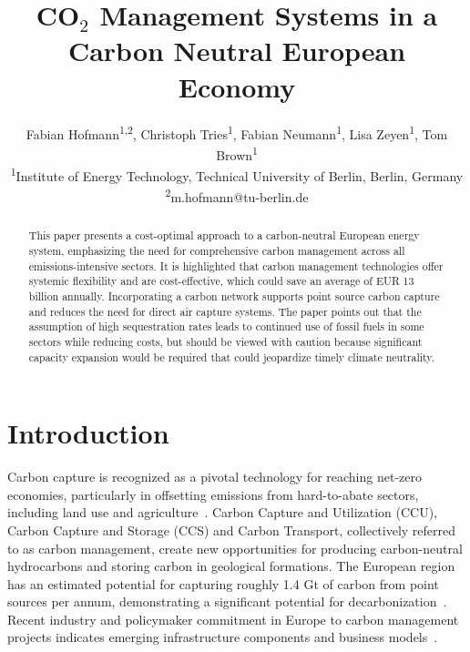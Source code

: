 \documentclass[twocolumn]{article}
\newcommand{\carbon}{CO$_2$}
\begin{document}
\title{\carbon{} Management Systems in a Carbon Neutral European Economy}

\author{
    Fabian Hofmann\textsuperscript{1,2},
    Christoph Tries\textsuperscript{1},
    Fabian Neumann\textsuperscript{1},
    Lisa Zeyen\textsuperscript{1},
    Tom Brown\textsuperscript{1}
    \vspace{.5em}
    \\
    \textsuperscript{1}Institute of Energy Technology, Technical University of Berlin, Berlin, Germany \\
    \textsuperscript{2}m.hofmann@tu-berlin.de
}

\maketitle

\begin{abstract}
    This paper presents a cost-optimal approach to a carbon-neutral European energy system, emphasizing the need for comprehensive carbon management across all emissions-intensive sectors. It is highlighted that carbon management technologies offer systemic flexibility and are cost-effective, which could save an average of EUR 13 billion annually. Incorporating a carbon network supports point source carbon capture and reduces the need for direct air capture systems. The paper points out that the assumption of high sequestration rates leads to continued use of fossil fuels in some sectors while reducing costs, but should be viewed with caution because significant capacity expansion would be required that could jeopardize timely climate neutrality.
\end{abstract}



\section{Introduction}
\label{sec:introduction}

Carbon capture is recognized as a pivotal technology for reaching net-zero economies, particularly in offsetting emissions from hard-to-abate sectors, including land use and agriculture~\cite{arniehellerNewCarbonEconomy2019}. Carbon Capture and Utilization (CCU), Carbon Capture and Storage (CCS) and Carbon Transport, collectively referred to as carbon management, create new opportunities for producing carbon-neutral hydrocarbons and storing carbon in geological formations. The European region has an estimated potential for capturing roughly 1.4 Gt of carbon from point sources per annum, demonstrating a significant potential for decarbonization~\cite{ToolsGreenTransition,weiProposedGlobalLayout2021}. Recent industry and policymaker commitment in Europe to carbon management projects indicates emerging infrastructure components and business models~\cite{adomaitisEquinorRWEBuild2023,apnewswireGermanyDrawLegislation2023,KohlenstoffKannKlimaschutz2023,OGETESJoin2022,TESHydrogenLife2023}.
\end{document}

